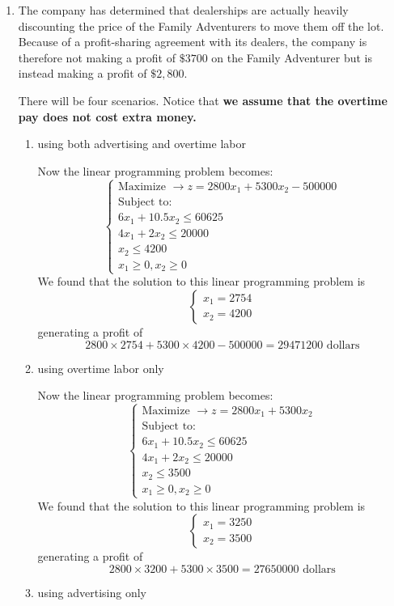 \documentclass[
]{article}
\begin{document}
\begin{enumerate}
\def\labelenumi{\arabic{enumi}.}
\setcounter{enumi}{5}
\item
  The company has determined that dealerships are actually heavily
  discounting the price of the Family Adventurers to move them off the
  lot. Because of a profit-sharing agreement with its dealers, the
  company is therefore not making a profit of \(\$ 3700\) on the Family
  Adventurer but is instead making a profit of \(\$ 2,800\).

  There will be four scenarios. Notice that \textbf{we assume that the
  overtime pay does not cost extra money.}

  \begin{enumerate}
  \def\labelenumii{\arabic{enumii}.}
  \item
    using both advertising and overtime labor

    Now the linear programming problem becomes: \[
    \begin{cases}
          \text{Maximize  } \rightarrow z = 2800x_1 + 5300x_2 -500000\\
          \text{Subject to:}\\
          6x_1 +10.5x_2 \leq 60625\\
          4x_1 + 2x_2 \leq 20000\\
          x_2 \leq 4200\\
          x_1 \geq 0, x_2 \geq 0
     \end{cases}
    \] We found that the solution to this linear programming problem is
    \[
    \begin{cases}
          x_1 = 2754\\ 
          x_2 = 4200
     \end{cases}
    \] generating a profit of \[
    2800 \times 2754 + 5300 \times 4200 - 500000 = 29471200 \text{   dollars}
    \]
  \item
    using overtime labor only

    Now the linear programming problem becomes: \[
    \begin{cases}
          \text{Maximize  } \rightarrow z = 2800x_1 + 5300x_2\\
          \text{Subject to:}\\
          6x_1 +10.5x_2 \leq 60625\\
          4x_1 + 2x_2 \leq 20000\\
          x_2 \leq 3500\\
          x_1 \geq 0, x_2 \geq 0
     \end{cases}
    \] We found that the solution to this linear programming problem is
    \[
    \begin{cases}
          x_1 = 3250\\ 
          x_2 = 3500
     \end{cases}
    \] generating a profit of \[
    2800 \times 3200 + 5300 \times 3500 = 27650000 \text{   dollars}
    \]
  \item
    using advertising only


\end{enumerate}
\end{enumerate}
\end{document}
